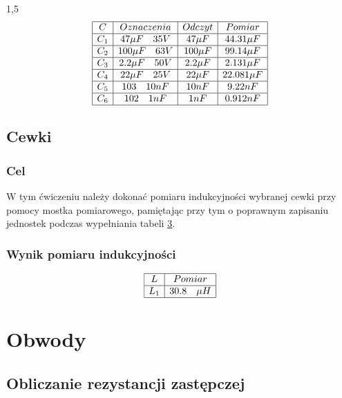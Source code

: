 \documentclass[polish,polish,a4paper]{article}
\begin{document}
\begin{spacing}{1,5}
		\begin{equation*}
		\label{eq:tab2}
		\begin{array}{|c|c|c|c|}
		\hline
		C&Oznaczenia&Odczyt&Pomiar \\ 
		\hline
		C_{1}& 47 \mu F \quad 35V &47 \mu F&44.31\mu F \\ 
		\hline
		C_{2}&100 \mu F \quad 63V &100 \mu F&99.14 \mu F \\ 
		\hline
		C_{3}&2.2 \mu F \quad 50V &2.2 \mu F&2.131 \mu F\\ 
		\hline
		C_{4}&22 \mu F \quad 25V&22 \mu F&22.081 \mu F  \\ 
		\hline
		C_{5}&103 \quad 10nF&10nF&9.22nF \\ 
		\hline
		C_{6}&102 \quad 1nF&1nF&0.912nF \\ 
		\hline
		\end{array}
		\end{equation*}
		
		
		\subsection{Cewki}
		\subsubsection*{Cel}
		W tym ćwiczeniu należy dokonać pomiaru indukcyjności wybranej cewki przy pomocy mostka pomiarowego,
		pamiętając przy tym o poprawnym zapisaniu jednostek podczas wypełniania tabeli \hyperref[eq:tab3]{3}.
		
		\subsubsection*{Wynik pomiaru indukcyjności}
		\begin{equation*}
		\label{eq:tab3}
		\begin{array}{|c|c|}
		\hline
		L&Pomiar \\
		\hline
		L_{1}&30.8 \quad \mu H \\
		\hline
		\end{array}
		\end{equation*}
		
		\section{Obwody}
		\subsection{Obliczanie rezystancji zastępczej}

\end{spacing}
\end{document}
